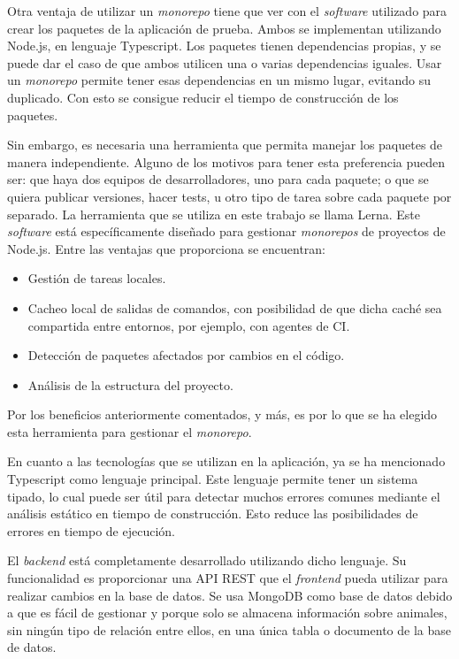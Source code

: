 Otra ventaja de utilizar un \textit{monorepo} tiene que ver con el \textit{software} utilizado para crear los paquetes de la aplicación de prueba. Ambos se implementan utilizando Node.js, en lenguaje Typescript\cite{ts}. Los paquetes tienen dependencias propias, y se puede dar el caso de que ambos utilicen una o varias dependencias iguales. Usar un \textit{monorepo} permite tener esas dependencias en un mismo lugar, evitando su duplicado. Con esto se consigue reducir el tiempo de construcción de los paquetes.

Sin embargo, es necesaria una herramienta que permita manejar los paquetes de manera independiente. Alguno de los motivos para tener esta preferencia pueden ser: que haya dos equipos de desarrolladores, uno para cada paquete; o que se quiera publicar versiones, hacer tests, u otro tipo de tarea sobre cada paquete por separado. La herramienta que se utiliza en este trabajo se llama Lerna\cite{lerna}. Este \textit{software} está específicamente diseñado para gestionar \textit{monorepos} de proyectos de Node.js. Entre las ventajas que proporciona se encuentran:

\begin{itemize}
  \item Gestión de tareas locales.
  \item Cacheo local de salidas de comandos, con posibilidad de que dicha caché sea compartida entre entornos, por ejemplo, con agentes de CI.
  \item Detección de paquetes afectados por cambios en el código.
  \item Análisis de la estructura del proyecto.
\end{itemize}

Por los beneficios anteriormente comentados, y más, es por lo que se ha elegido esta herramienta para gestionar el \textit{monorepo}.

En cuanto a las tecnologías que se utilizan en la aplicación, ya se ha mencionado Typescript como lenguaje principal. Este lenguaje permite tener un sistema tipado, lo cual puede ser útil para detectar muchos errores comunes mediante el análisis estático en tiempo de construcción. Esto reduce las posibilidades de errores en tiempo de ejecución.

El \textit{backend} está completamente desarrollado utilizando dicho lenguaje. Su funcionalidad es proporcionar una API REST que el \textit{frontend} pueda utilizar para realizar cambios en la base de datos. Se usa MongoDB\cite{mongodb} como base de datos debido a que es fácil de gestionar y porque solo se almacena información sobre animales, sin ningún tipo de relación entre ellos, en una única tabla o documento de la base de datos.

